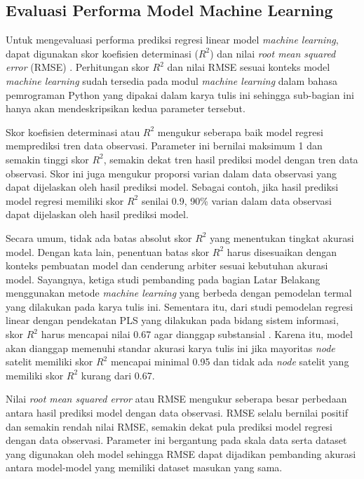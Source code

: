 \subsection{Evaluasi Performa Model Machine Learning}

Untuk mengevaluasi performa prediksi regresi linear model \textit{machine
learning}, dapat digunakan skor koefisien determinasi ($R^2$) \cite{gupta2021}
dan nilai \textit{root mean squared error} (RMSE) \cite{zheng}. Perhitungan
skor $R^2$ dan nilai RMSE sesuai konteks model \textit{machine learning} sudah
tersedia pada modul \textit{machine learning} dalam bahasa pemrograman Python
yang dipakai dalam karya tulis ini sehingga sub-bagian ini hanya akan
mendeskripsikan kedua parameter tersebut.

Skor koefisien determinasi atau $R^2$ mengukur seberapa baik model regresi
memprediksi tren data observasi. Parameter ini bernilai maksimum 1 dan semakin
tinggi skor $R^2$, semakin dekat tren hasil prediksi model dengan tren data
observasi. Skor ini juga mengukur proporsi varian dalam data observasi yang
dapat dijelaskan oleh hasil prediksi model. Sebagai contoh, jika hasil prediksi
model regresi memiliki skor $R^2$ senilai 0.9, 90\% varian dalam data
observasi dapat dijelaskan oleh hasil prediksi model.

Secara umum, tidak ada batas absolut skor $R^2$ yang menentukan tingkat akurasi
model. Dengan kata lain, penentuan batas skor $R^2$ harus disesuaikan dengan
konteks pembuatan model dan cenderung arbiter sesuai kebutuhan akurasi model.
Sayangnya, ketiga studi pembanding pada bagian Latar Belakang menggunakan
metode \textit{machine learning} yang berbeda dengan pemodelan termal yang
dilakukan pada karya tulis ini. Sementara itu, dari studi pemodelan regresi
linear dengan pendekatan PLS yang dilakukan pada bidang sistem informasi, skor
$R^2$ harus mencapai nilai 0.67 agar dianggap substansial \cite{urbach2010}.
Karena itu, model akan dianggap memenuhi standar akurasi karya tulis ini jika
mayoritas \textit{node} satelit memiliki skor $R^2$ mencapai minimal 0.95 dan
tidak ada \textit{node} satelit yang memiliki skor $R^2$ kurang dari 0.67.

Nilai \textit{root mean squared error} atau RMSE mengukur seberapa besar
perbedaan antara hasil prediksi model dengan data observasi. RMSE selalu
bernilai positif dan semakin rendah nilai RMSE, semakin dekat pula prediksi
model regresi dengan data observasi. Parameter ini bergantung pada skala data
serta dataset yang digunakan oleh model sehingga RMSE dapat
dijadikan pembanding akurasi antara model-model yang memiliki dataset masukan
yang sama.

